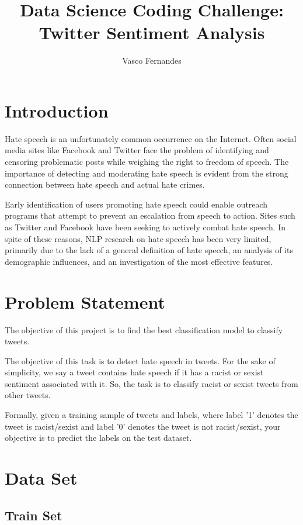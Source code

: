 \documentclass{article}
\begin{document}
	\title{Data Science Coding Challenge: Twitter Sentiment Analysis}
	\author{Vasco Fernandes}
	\maketitle
	\tableofcontents
	\section{Introduction}
		Hate  speech  is  an  unfortunately  common  occurrence  on  the  Internet.  Often social media sites like Facebook and Twitter face the problem of identifying and censoring  problematic  posts  while weighing the right to freedom of speech. The  importance  of  detecting  and  moderating hate  speech  is  evident  from  the  strong  connection between hate speech and actual hate crimes. 
		
		Early identification of users promoting  hate  speech  could  enable  outreach  programs that attempt to prevent an escalation from speech to action. Sites such as Twitter and Facebook have been seeking  to  actively  combat  hate  speech. In spite of these reasons, NLP research on hate speech has been very limited, primarily due to the lack of a general definition of hate speech, an analysis of its demographic influences, and an investigation of the most effective features.
	\section{Problem Statement}
		The objective of this project is to find the best classification model to classify tweets.
		
		The objective of this task is to detect hate speech in tweets. For the sake of simplicity, we say a tweet contains hate speech if it has a racist or sexist sentiment associated with it. So, the task is to classify racist or sexist tweets from other tweets.
		
		Formally, given a training sample of tweets and labels, where label '1' denotes the tweet is racist/sexist and label '0' denotes the tweet is not racist/sexist, your objective is to predict the labels on the test dataset. 
		
	\section{Data Set}
	
	\subsection{Train Set}
	
\end{document}
